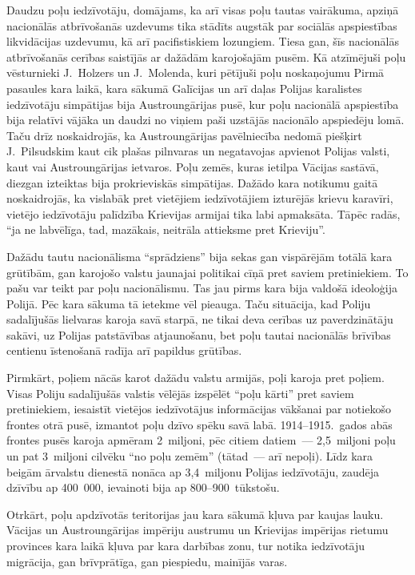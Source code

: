 \documentclass[twoside,a5paper,12pt,fleqn,openany]{extbook}
\begin{document}
Daudzu poļu iedzīvotāju, domājams, ka arī visas poļu tautas vairākuma, apziņā nacionālās atbrīvošanās uzdevums tika stādīts augstāk par sociālās apspiestības likvidācijas uzdevumu, kā arī pacifistiskiem lozungiem. Tiesa gan, šīs nacionālās atbrīvošanās cerības saistījās ar dažādām karojošajām pusēm. Kā atzīmējuši poļu vēsturnieki J.~Holzers un J.~Molenda, kuri pētījuši poļu noskaņojumu Pirmā pasaules kara laikā, kara sākumā Galīcijas un arī daļas Polijas karalistes iedzīvotāju simpātijas bija Austroungārijas pusē, kur poļu nacionālā apspiestība bija relatīvi vājāka un daudzi no viņiem paši uzstājās nacionālo apspiedēju lomā. Taču drīz noskaidrojās, ka Austroungārijas pavēlniecība nedomā piešķirt J.~Pilsudskim kaut cik plašas pilnvaras un negatavojas apvienot Polijas valsti, kaut vai Austroungārijas ietvaros. Poļu zemēs, kuras ietilpa Vācijas sastāvā, diezgan izteiktas bija prokrieviskās simpātijas. Dažādo kara notikumu gaitā noskaidrojās, ka vislabāk pret vietējiem iedzīvotājiem izturējās krievu karavīri, vietējo iedzīvotāju palīdzība Krievijas armijai tika labi apmaksāta. Tāpēc radās, ``ja ne labvēlīga, tad, mazākais, neitrāla attieksme pret Krieviju''.

Dažādu tautu nacionālisma ``sprādziens'' bija sekas gan vispārējām totālā kara grūtībām, gan karojošo valstu jaunajai politikai cīņā pret saviem pretiniekiem. To pašu var teikt par poļu nacionālismu. Tas jau pirms kara bija valdošā ideoloģija Polijā. Pēc kara sākuma tā ietekme vēl pieauga. Taču situācija, kad Poliju sadalījušās lielvaras karoja savā starpā, ne tikai deva cerības uz paverdzinātāju sakāvi, uz Polijas patstāvības atjaunošanu, bet poļu tautai nacionālās brīvības centienu īstenošanā radīja arī papildus grūtības.

Pirmkārt, poļiem nācās karot dažādu valstu armijās, poļi karoja pret poļiem. Visas Poliju sadalījušās valstis vēlējās izspēlēt ``poļu kārti'' pret saviem pretiniekiem, iesaistīt vietējos iedzīvotājus informācijas vākšanai par notiekošo frontes otrā pusē, izmantot poļu dzīvo spēku savā labā. 1914--1915.~gados abās frontes pusēs karoja apmēram 2~miljoni, pēc citiem datiem~--- 2,5~miljoni poļu un pat 3~miljoni cilvēku ``no poļu zemēm'' (tātad~--- arī nepoļi). Līdz kara beigām ārvalstu dienestā nonāca ap 3,4~miljonu Polijas iedzīvotāju, zaudēja dzīvību ap 400~000, ievainoti bija ap 800--900~tūkstošu.

Otrkārt, poļu apdzīvotās teritorijas jau kara sākumā kļuva par kaujas lauku. Vācijas un Austroungārijas impēriju austrumu un Krievijas impērijas rietumu provinces kara laikā kļuva par kara darbības zonu, tur notika iedzīvotāju migrācija, gan brīvprātīga, gan piespiedu, mainījās varas.
\end{document}
